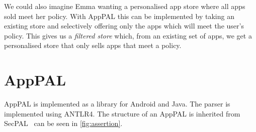 \documentclass[]{llncs}
\begin{document}
We could also imagine Emma wanting a personalised app store where all apps sold meet her policy.
With AppPAL this can be implemented by taking an existing store and selectively offering only the apps which will meet the user's policy.
This gives us a \emph{filtered store} which, from an existing set of apps, we get a personalised store that only sells apps that meet a policy.

\section{AppPAL}
\label{sec:details}
\label{ssec:language}

AppPAL is implemented as a library for Android and Java.
The parser is implemented using ANTLR4.
The structure of an AppPAL is inherited from SecPAL~\cite{Becker:2006vh} can be seen in \autoref{fig:assertion}.
\end{document}
